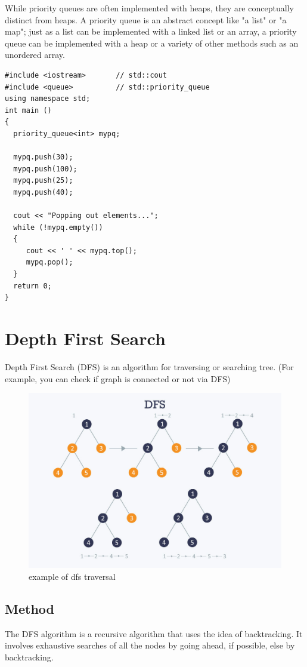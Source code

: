 \documentclass[12pt]{article}
\begin{document}
    While priority queues are often implemented with heaps, they are conceptually distinct from heaps. A priority queue is an abstract concept like "a list" or "a map"; just as a list can be implemented with a linked list or an array, a priority queue can be implemented with a heap or a variety of other methods such as an unordered array. \cite{8,9}
    \begin{verbatim}
#include <iostream>       // std::cout
#include <queue>          // std::priority_queue
using namespace std;
int main ()
{
  priority_queue<int> mypq;

  mypq.push(30);
  mypq.push(100);
  mypq.push(25);
  mypq.push(40);

  cout << "Popping out elements...";
  while (!mypq.empty())
  {
     cout << ' ' << mypq.top();
     mypq.pop();
  }
  return 0;
}
\end{verbatim}

    

\section{Depth First Search}

    Depth First Search (DFS) is an algorithm for traversing or searching tree. (For example, you can check if graph is connected or not via DFS)  \cite{15}

    \begin{figure}[h]
      \centering
         \includegraphics[width=\linewidth /3*2]{9fa1119.jpg}
     \caption{example of dfs traversal}
    \end{figure}    
    \subsection{Method}
        The DFS algorithm is a recursive algorithm that uses the idea of backtracking. It involves exhaustive searches of all the nodes by going ahead, if possible, else by backtracking.
\end{document}
